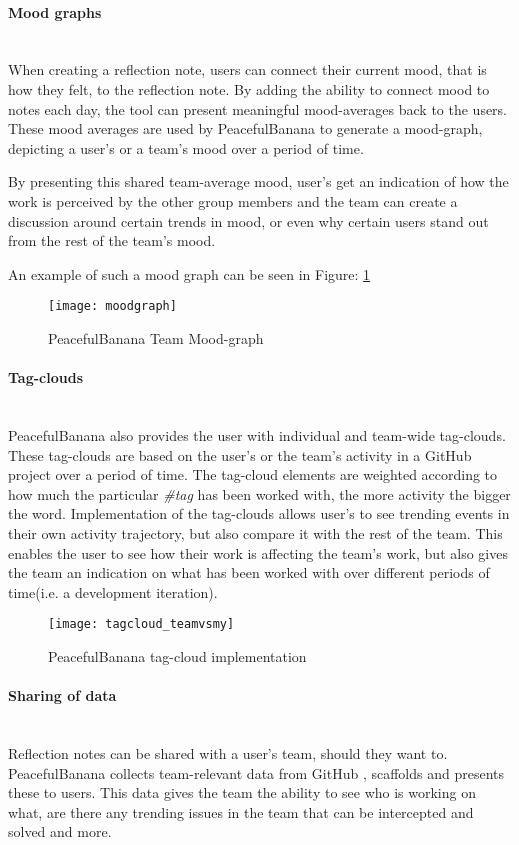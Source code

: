 \paragraph{Mood graphs}\mbox{}\\
When creating a reflection note, users can connect their current mood, that is how they felt, to the reflection note. By adding the ability to connect mood to notes each day, the tool can present meaningful mood-averages back to the users. These mood averages are used by PeacefulBanana to generate a mood-graph, depicting a user's or a team's mood over a period of time. 

By presenting this shared team-average mood, user's get an indication of how the work is perceived by the other group members and the team can create a discussion around certain trends in mood, or even why certain users stand out from the rest of the team's mood. 

An example of such a mood graph can be seen in Figure: \ref{moodgraphfunc}
\begin{figure}[H]
    \centering
        \texttt{[image: moodgraph]}
    \caption{PeacefulBanana Team Mood-graph}
    \label{moodgraphfunc}
\end{figure}
\paragraph{Tag-clouds}\mbox{}\\
PeacefulBanana also provides the user with individual and team-wide tag-clouds. These tag-clouds are based on the user's or the team's activity in a GitHub project over a period of time. The tag-cloud elements are weighted according to how much the particular \emph{\#tag} has been worked with, the more activity the bigger the word. Implementation of the tag-clouds allows user's to see trending events in their own activity trajectory, but also compare it with the rest of the team. This enables the user to see how their work is affecting the team's work, but also gives the team an indication on what has been worked with over different periods of time(i.e. a development iteration). 
\begin{figure}[H]
    \centering
        \texttt{[image: tagcloud\_teamvsmy]}
    \caption{PeacefulBanana tag-cloud implementation}
    \label{tagcloud_teamvsmy}
\end{figure}

\paragraph{Sharing of data}\mbox{}\\
Reflection notes can be shared with a user's team, should they want to.  PeacefulBanana collects team-relevant data from GitHub , scaffolds and presents these to users. This data gives the team the ability to see who is working on what, are there any trending issues in the team that can be intercepted and solved and more.  

